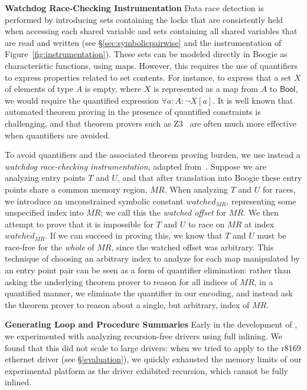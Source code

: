 \noindent\textbf{Watchdog Race-Checking Instrumentation }
%
Data race detection is performed by introducing sets containing the locks that are consistently held when accessing each shared variable and sets containing all shared variables that are read and written (see \S\ref{sec:symbolicpairwise} and the instrumentation of Figure~\ref{fig:instrumentation}). These sets can be modeled directly in Boogie as characteristic functions, using maps. However, this requires the use of quantifiers to express properties related to set contents.  For instance, to express that a set $X$ of elements of type $A$ is empty, where $X$ is represented as a map from $A$ to $\mathsf{Bool}$, we would require the quantified expression $\forall a : A : \neg X[a]$.  It is well known that automated theorem proving in the presence of quantified constraints is challenging, and that theorem provers such as Z3~\cite{de2008z3} are often much more effective when quantifiers are avoided.  

To avoid quantifiers and the associated theorem proving burden, we use instead a \emph{watchdog race-checking instrumentation}, adapted from~\cite{bardsley2014engineering}.  Suppose we are analyzing entry points $T$ and $U$, and that after translation into Boogie these entry points share a common memory region, $\mathit{MR}$.  When analyzing $T$ and $U$ for races, we introduce an unconstrained symbolic constant $\mathit{watched}_{\mathit{MR}}$, representing some unspecified index into $\mathit{MR}$; we call this the \emph{watched offset} for $\mathit{MR}$.  We then attempt to prove that it is impossible for $T$ and $U$ to race on $\mathit{MR}$ at index $\mathit{watched}_{\mathit{MR}}$.  If we can succeed in proving this, we know that $T$ and $U$ must be race-free for the \emph{whole} of $\mathit{MR}$, since the watched offset was arbitrary.  This technique of choosing an arbitrary index to analyze for each map manipulated by an entry point pair can be seen as a form of quantifier elimination: rather than asking the underlying theorem prover to reason for all indices of $\mathit{MR}$, in a quantified manner, we eliminate the quantifier in our encoding, and instead ask the theorem prover to reason about a single, but arbitrary, index of $\mathit{MR}$.

\noindent\textbf{Generating Loop and Procedure Summaries }
%
Early in the development of \whoop, we experimented with analyzing recursion-free drivers using full inlining.  We found that this did not scale to large drivers: when we tried to apply \whoop to the r8169 ethernet driver (see \S\ref{evaluation}), we quickly exhausted the memory limits of our experimental platform as the driver exhibited recursion, which cannot be fully inlined.


